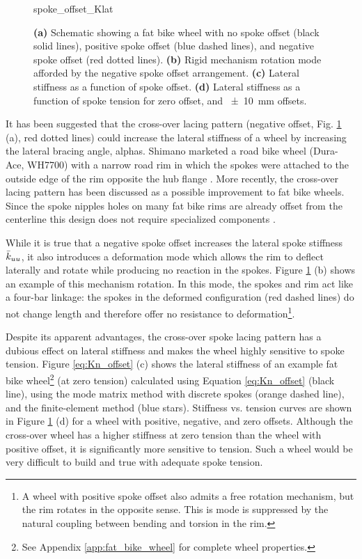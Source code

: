 \documentclass[\rootdir/thesis.tex]{subfiles}
\begin{document}
\begin{figure}[t]
\centering
{spoke_offset_Klat}
\caption{\textbf{(a)} Schematic showing a fat bike wheel with no spoke offset (black solid lines), positive spoke offset (blue dashed lines), and negative spoke offset (red dotted lines). \textbf{(b)} Rigid mechanism rotation mode afforded by the negative spoke offset arrangement. \textbf{(c)} Lateral stiffness as a function of spoke offset. \textbf{(d)} Lateral stiffness as a function of spoke tension for zero offset, and \SI{+-10}{mm} offsets.}
\label{fig:spoke_offset}
\end{figure}

It has been suggested that the cross-over lacing pattern (negative offset, Fig. \ref{fig:spoke_offset} (a), red dotted lines) could increase the lateral stiffness of a wheel by increasing the lateral bracing angle, \gls{alphas}. Shimano marketed a road bike wheel (Dura-Ace, WH7700) with a narrow road rim in which the spokes were attached to the outside edge of the rim opposite the hub flange \cite{Rinard}. More recently, the cross-over lacing pattern has been discussed as a possible improvement to fat bike wheels. Since the spoke nipples holes on many fat bike rims are already offset from the centerline this design does not require specialized components \cite{MTB forums}.

While it is true that a negative spoke offset increases the lateral spoke stiffness $\bar{k}_{uu}$, it also introduces a deformation mode which allows the rim to deflect laterally and rotate while producing no reaction in the spokes. Figure \ref{fig:spoke_offset} (b) shows an example of this mechanism rotation. In this mode, the spokes and rim act like a four-bar linkage: the spokes in the deformed configuration (red dashed lines) do not change length and therefore offer no resistance to deformation\footnote{A wheel with positive spoke offset also admits a free rotation mechanism, but the rim rotates in the opposite sense. This is mode is suppressed by the natural coupling between bending and torsion in the rim.}.

Despite its apparent advantages, the cross-over spoke lacing pattern has a dubious effect on lateral stiffness and makes the wheel highly sensitive to spoke tension. Figure \ref{eq:Kn_offset} (c) shows the lateral stiffness of an example fat bike wheel\footnote{See Appendix \ref{app:fat_bike_wheel} for complete wheel properties.} (at zero tension) calculated using Equation \eqref{eq:Kn_offset} (black line), using the mode matrix method with discrete spokes (orange dashed line), and the finite-element method (blue stars). Stiffness vs. tension curves are shown in Figure \ref{fig:spoke_offset} (d) for a wheel with positive, negative, and zero offsets. Although the cross-over wheel has a higher stiffness at zero tension than the wheel with positive offset, it is significantly more sensitive to tension. Such a wheel would be very difficult to build and true with adequate spoke tension.
\end{document}
